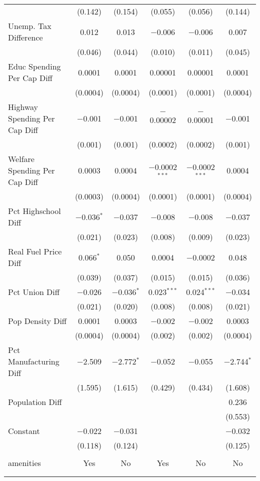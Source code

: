 \begin{table}[!htbp]
\begin{tabular}{@{\extracolsep{5pt}}lccccc}
  & (0.142) & (0.154) & (0.055) & (0.056) & (0.144) \\ 
  Unemp. Tax Difference & 0.012 & 0.013 & $-$0.006 & $-$0.006 & 0.007 \\ 
  & (0.046) & (0.044) & (0.010) & (0.011) & (0.045) \\ 
  Educ Spending Per Cap Diff & 0.0001 & 0.0001 & 0.00001 & 0.00001 & 0.0001 \\ 
  & (0.0004) & (0.0004) & (0.0001) & (0.0001) & (0.0004) \\ 
  Highway Spending Per Cap Diff & $-$0.001 & $-$0.001 & $-$0.00002 & $-$0.00001 & $-$0.001 \\ 
  & (0.001) & (0.001) & (0.0002) & (0.0002) & (0.001) \\ 
  Welfare Spending Per Cap Diff & 0.0003 & 0.0004 & $-$0.0002$^{***}$ & $-$0.0002$^{***}$ & 0.0004 \\ 
  & (0.0003) & (0.0004) & (0.0001) & (0.0001) & (0.0004) \\ 
  Pct Highschool Diff & $-$0.036$^{*}$ & $-$0.037 & $-$0.008 & $-$0.008 & $-$0.037 \\ 
  & (0.021) & (0.023) & (0.008) & (0.009) & (0.023) \\ 
  Real Fuel Price Diff & 0.066$^{*}$ & 0.050 & 0.0004 & $-$0.0002 & 0.048 \\ 
  & (0.039) & (0.037) & (0.015) & (0.015) & (0.036) \\ 
  Pct Union Diff & $-$0.026 & $-$0.036$^{*}$ & 0.023$^{***}$ & 0.024$^{***}$ & $-$0.034 \\ 
  & (0.021) & (0.020) & (0.008) & (0.008) & (0.021) \\ 
  Pop Density Diff & 0.0001 & 0.0003 & $-$0.002 & $-$0.002 & 0.0003 \\ 
  & (0.0004) & (0.0004) & (0.002) & (0.002) & (0.0004) \\ 
  Pct Manufacturing Diff & $-$2.509 & $-$2.772$^{*}$ & $-$0.052 & $-$0.055 & $-$2.744$^{*}$ \\ 
  & (1.595) & (1.615) & (0.429) & (0.434) & (1.608) \\ 
  Population Diff &  &  &  &  & 0.236 \\ 
  &  &  &  &  & (0.553) \\ 
  Constant & $-$0.022 & $-$0.031 &  &  & $-$0.032 \\ 
  & (0.118) & (0.124) &  &  & (0.125) \\ 
 \hline \\[-1.8ex] 
amenities & Yes & No & Yes & No & No \\ 
\hline \\[-1.8ex] 
\hline 
\hline \\[-1.8ex] 
\end{tabular} 
\end{table} 
